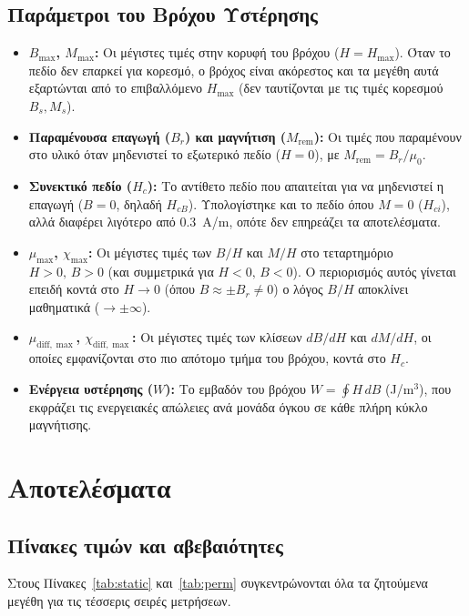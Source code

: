 \documentclass[11pt,a4paper]{article}
\newcommand{\diff}{\mathrm{diff}}
\begin{document}
\subsection{Παράμετροι του Βρόχου Υστέρησης}
\begin{itemize}[nosep]
 \item \textbf{$B_{\max}$, $M_{\max}$:} Οι μέγιστες τιμές στην κορυφή του βρόχου ($H = H_{\max}$). Όταν το πεδίο δεν επαρκεί για κορεσμό, ο βρόχος είναι ακόρεστος και τα μεγέθη αυτά εξαρτώνται από το επιβαλλόμενο $H_{\max}$ (δεν ταυτίζονται με τις τιμές κορεσμού $B_s, M_s$).
 \item \textbf{Παραμένουσα επαγωγή ($B_r$) και μαγνήτιση ($M_{\mathrm{rem}}$):} Οι τιμές που παραμένουν στο υλικό όταν μηδενιστεί το εξωτερικό πεδίο ($H = 0$), με $M_{\mathrm{rem}} = B_r/\mu_0$.
 \item \textbf{Συνεκτικό πεδίο ($H_c$):} Το αντίθετο πεδίο που απαιτείται για να μηδενιστεί η επαγωγή ($B = 0$, δηλαδή $H_{cB}$). Υπολογίστηκε και το πεδίο όπου $M = 0$ ($H_{ci}$), αλλά διαφέρει λιγότερο από $0.3$~\textlatin{A/m}, οπότε δεν επηρεάζει τα αποτελέσματα.
 \item \textbf{$\mu_{\max}$, $\chi_{\max}$:} Οι μέγιστες τιμές των $B/H$ και $M/H$ στο τεταρτημόριο $H>0,\,B>0$ (και συμμετρικά για $H<0,\,B<0$). Ο περιορισμός αυτός γίνεται επειδή κοντά στο $H \to 0$ (όπου $B \approx \pm B_r \neq 0$) ο λόγος $B/H$ αποκλίνει μαθηματικά ($\to \pm\infty$).
 \item \textbf{$\mu_{\diff,\max}$, $\chi_{\diff,\max}$:} Οι μέγιστες τιμές των κλίσεων $dB/dH$ και $dM/dH$, οι οποίες εμφανίζονται στο πιο απότομο τμήμα του βρόχου, κοντά στο $H_c$.
 \item \textbf{Ενέργεια υστέρησης ($W$):} Το εμβαδόν του βρόχου $W = \oint H\,dB$ (\textlatin{J/m}$^3$), που εκφράζει τις ενεργειακές απώλειες ανά μονάδα όγκου σε κάθε πλήρη κύκλο μαγνήτισης.
\end{itemize}


\section{Αποτελέσματα}

\subsection{Πίνακες τιμών και αβεβαιότητες}
Στους Πίνακες~\ref{tab:static} και~\ref{tab:perm} συγκεντρώνονται όλα τα ζητούμενα μεγέθη για τις τέσσερις σειρές μετρήσεων.
\end{document}
